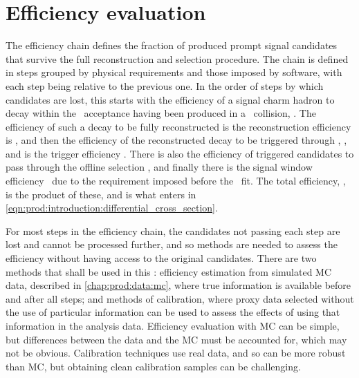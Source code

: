 \chapter{Efficiency evaluation}
\label{chap:prod:effs}


The efficiency chain defines the fraction of produced prompt signal candidates 
that survive the full reconstruction and selection procedure.
The chain is defined in steps grouped by physical requirements and those 
imposed by software, with each step being relative to the previous one.
In the order of steps by which candidates are lost, this starts with the efficiency of a signal charm hadron to decay within the 
\lhcb\ acceptance having been produced in a \pp\ collision, \effacc.
The efficiency of such a decay to be fully reconstructed is the reconstruction 
efficiency is \effreco, and then the efficiency of the reconstructed decay to 
be triggered through \lzero, \hltone, and \hlttwo is the trigger efficiency 
\efftrig.
There is also the efficiency of triggered candidates to pass through the 
offline selection \effoffline, and finally there is the signal window 
efficiency \effsigwin\ due to the requirement imposed before the \lnipchisq\ 
fit.
The total efficiency, \eff, is the product of these, and is what enters in 
\cref{eqn:prod:introduction:differential_cross_section}.

For most steps in the efficiency chain, the candidates not passing each step 
are lost and cannot be processed further, and so methods are needed to assess the 
efficiency without having access to the original candidates.
There are two methods that shall be used in this : 
efficiency estimation from simulated \acf{MC} data, described in 
\cref{chap:prod:data:mc}, where true information is available before and after 
all steps; and methods of calibration, where proxy data selected without the 
use of particular information can be used to assess the effects of using that information in the 
analysis data.
Efficiency evaluation with \ac{MC} can be simple, but differences between the 
data and the \ac{MC} must be accounted for, which may not be obvious.
Calibration techniques use real data, and so can be more robust than \ac{MC}, 
but obtaining clean calibration samples can be challenging.

